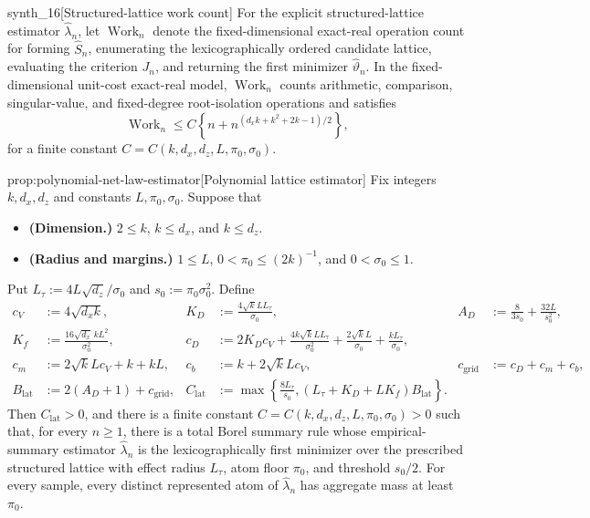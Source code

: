 \begin{definitionv}{synth_16}[Structured-lattice work count]
For the explicit structured-lattice estimator \(\widehat\lambda_n\), let \(\operatorname{Work}_n\) denote the fixed-dimensional exact-real operation count for forming \(\widehat S_n\), enumerating the lexicographically ordered candidate lattice, evaluating the criterion \(J_n\), and returning the first minimizer \(\widehat\vartheta_n\). In the fixed-dimensional unit-cost exact-real model, \(\operatorname{Work}_n\) counts arithmetic, comparison, singular-value, and fixed-degree root-isolation operations and satisfies
\[
\operatorname{Work}_n\le C\left\{n+n^{(d_xk+k^2+2k-1)/2}\right\},
\]
for a finite constant \(C=C(k,d_x,d_z,L,\pi_0,\sigma_0)\).
\end{definitionv}

\begin{propositionv}{prop:polynomial-net-law-estimator}[Polynomial lattice estimator]
Fix integers \(k,d_x,d_z\) and constants \(L,\pi_0,\sigma_0\).  Suppose that
\begin{itemize}
\item \textbf{(Dimension.)} \(2\le k\), \(k\le d_x\), and \(k\le d_z\).
\item \textbf{(Radius and margins.)} \(1\le L\), \(0<\pi_0\le (2k)^{-1}\), and \(0<\sigma_0\le 1\).
\end{itemize}
Put \(L_\tau:=4L\sqrt{d_z}/\sigma_0\) and \(s_0:=\pi_0\sigma_0^2\).  Define
\[
\begin{aligned}
c_V&:=4\sqrt{d_xk},
&
K_D&:=\frac{4\sqrt{k}LL_\tau}{\sigma_0},
&
A_D&:=\frac{8}{3s_0}+\frac{32L}{s_0^2},\\
K_f&:=\frac{16\sqrt{d_x}\,kL^2}{\sigma_0^2},
&
c_D&:=2K_Dc_V+\frac{4k\sqrt{k}LL_\tau}{\sigma_0^2}
+\frac{2\sqrt{k}L}{\sigma_0}+\frac{kL_\tau}{\sigma_0},\\
c_m&:=2\sqrt{k}Lc_V+k+kL,
&
c_b&:=k+2\sqrt{k}Lc_V,
&
c_{\mathrm{grid}}&:=c_D+c_m+c_b,\\
B_{\mathrm{lat}}&:=2(A_D+1)+c_{\mathrm{grid}},
&
C_{\mathrm{lat}}&:=\max\!\left\{\frac{8L_\tau}{s_0},
(L_\tau+K_D+LK_f)B_{\mathrm{lat}}\right\}.
\end{aligned}
\]
Then \(C_{\mathrm{lat}}>0\), and there is a finite constant
\(C=C(k,d_x,d_z,L,\pi_0,\sigma_0)>0\) such that, for every \(n\ge1\), there is a total Borel summary rule whose empirical-summary estimator \(\widehat\lambda_n\) is the lexicographically first minimizer over the prescribed structured lattice with effect radius \(L_\tau\), atom floor \(\pi_0\), and threshold \(s_0/2\).  For every sample, every distinct represented atom of \(\widehat\lambda_n\) has aggregate mass at least \(\pi_0\).


\end{propositionv}
